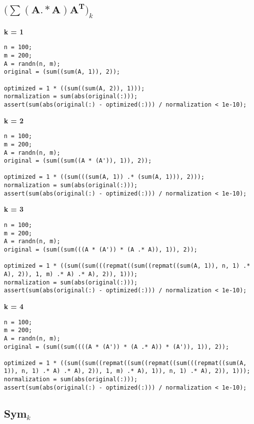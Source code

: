 \subsection{$\mathbf{(\sum (A.*A)A^T})_k$}



{\bf k = 1}

\begin{lstlisting}
n = 100;
m = 200;
A = randn(n, m);
original = (sum((sum(A, 1)), 2));

optimized = 1 * ((sum((sum(A, 2)), 1)));
normalization = sum(abs(original(:)));
assert(sum(abs(original(:) - optimized(:))) / normalization < 1e-10);
\end{lstlisting}


{\bf k = 2}

\begin{lstlisting}
n = 100;
m = 200;
A = randn(n, m);
original = (sum((sum((A * (A')), 1)), 2));

optimized = 1 * ((sum(((sum(A, 1)) .* (sum(A, 1))), 2)));
normalization = sum(abs(original(:)));
assert(sum(abs(original(:) - optimized(:))) / normalization < 1e-10);
\end{lstlisting}


{\bf k = 3}

\begin{lstlisting}
n = 100;
m = 200;
A = randn(n, m);
original = (sum((sum(((A * (A')) * (A .* A)), 1)), 2));

optimized = 1 * ((sum((sum(((repmat((sum((repmat((sum(A, 1)), n, 1) .* A), 2)), 1, m) .* A) .* A), 2)), 1)));
normalization = sum(abs(original(:)));
assert(sum(abs(original(:) - optimized(:))) / normalization < 1e-10);
\end{lstlisting}


{\bf k = 4}

\begin{lstlisting}
n = 100;
m = 200;
A = randn(n, m);
original = (sum((sum((((A * (A')) * (A .* A)) * (A')), 1)), 2));

optimized = 1 * ((sum((sum((repmat((sum((repmat((sum(((repmat((sum(A, 1)), n, 1) .* A) .* A), 2)), 1, m) .* A), 1)), n, 1) .* A), 2)), 1)));
normalization = sum(abs(original(:)));
assert(sum(abs(original(:) - optimized(:))) / normalization < 1e-10);
\end{lstlisting}


\subsection{{\bf Sym$_k$}}



